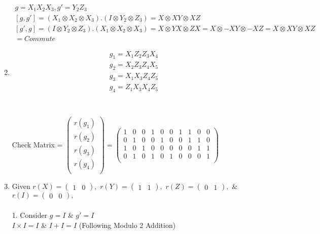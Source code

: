 \documentclass[a4paper,12pt]{article}
\begin{document}
\begin{enumerate}[label=(\alph*)]
\begin{gather*}
        g=X_1X_2X_3, g'=Y_2Z_3\\
        [g,g'] = (X_1 \otimes X_2 \otimes X_3) . (I \otimes Y_2 \otimes Z_3 ) = X \otimes XY \otimes XZ\\
        [g',g] = (I \otimes Y_2 \otimes Z_3 ).(X_1 \otimes X_2 \otimes X_3)  = X \otimes YX \otimes ZX = X \otimes -XY \otimes -XZ =  X \otimes XY \otimes XZ\\
        = Commute
    \end{gather*}   
    \item \begin{gather*}
        g_1 = X_1Z_2Z_3X_4\\
        g_2 =  X_2Z_3Z_4X_5\\
        g_3 = X_1X_3Z_4Z_5\\
        g_4 = Z_1X_3X_4Z_5\\
    \end{gather*}\\~\\
    Check Matrix =
    $\begin{pmatrix}
    r(g_1)\\
    r(g_2)\\
    r(g_3)\\
    r(g_4)\\
    \end{pmatrix} = \begin{pmatrix}
    1 & 0 & 0 & 1 & 0 & 0 & 1 & 1 & 0 & 0 \\
    0 & 1 & 0 & 0 & 1 & 0 & 0 & 1 & 1 & 0 \\
    1 & 0 & 1 & 0 & 0 & 0 & 0 & 0 & 1 & 1 \\
    0 & 1 & 0 & 1 & 0 & 1 & 0 & 0 & 0 & 1 \\
    \end{pmatrix}$
\item Given $r(X)= \begin{pmatrix}
    1 & 0
\end{pmatrix},$ $r(Y)= \begin{pmatrix}
    1 & 1
\end{pmatrix},$ $r(Z)= \begin{pmatrix}
    0 & 1
\end{pmatrix},$ \& $r(I)= \begin{pmatrix}
    0 & 0
\end{pmatrix},$ \\~\\
1. Consider $g=I$ \& $g'=I$ \\
$I \times I = I$ \& $I + I = I$ (Following Modulo 2 Addition)

\end{enumerate}
\end{document}
